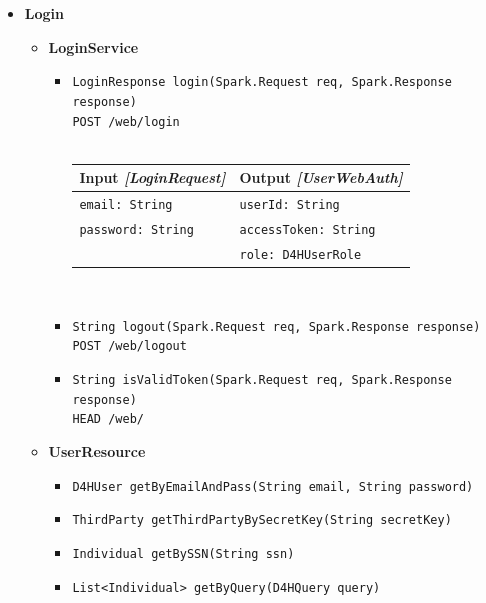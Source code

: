 \documentclass[a4paper, hidelinks, 12pt]{report}
\begin{document}
	\begin{itemize}
		\item{\textbf{Login}}
			\begin{itemize}
	\item{\textbf{LoginService}}
		\begin{itemize}
			\item{\verb|LoginResponse login(Spark.Request req, Spark.Response response)|\\ \verb|POST /web/login|}\\\\
			\begin{tabular}{l | l}
			\textbf{Input} \textit{[LoginRequest]} & \textbf{Output} \textit{[UserWebAuth]} \\
			\hline
			\verb|email: String| & \verb|userId: String| \\
			\verb|password: String| & \verb|accessToken: String| \\
			& \verb|role: D4HUserRole| 
			\end{tabular}\\
			
			\item{\verb|String logout(Spark.Request req, Spark.Response response)|\\ \verb|POST /web/logout|}
			\item{\verb|String isValidToken(Spark.Request req, Spark.Response response)|\\ \verb|HEAD /web/|}
			\end{itemize}
				
		\item{\textbf{UserResource}}
			\begin{itemize}
				\item{\verb|D4HUser getByEmailAndPass(String email, String password)|}
				\item{\verb|ThirdParty getThirdPartyBySecretKey(String secretKey)|}
				\item{\verb|Individual getBySSN(String ssn)|}
				\item{\verb|List<Individual> getByQuery(D4HQuery query)|}
			\end{itemize}
	  \end{itemize}
			

\end{itemize}
\end{document}
